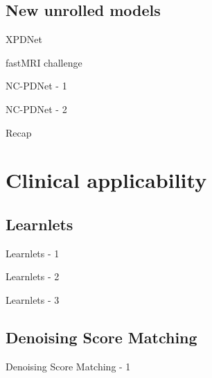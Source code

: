 \documentclass[aspectratio=169,xcolor=dvipsnames]{beamer}
\begin{document}
\subsection{New unrolled models}
\begin{frame}{XPDNet}
\end{frame}

\begin{frame}{fastMRI challenge}
\end{frame}

\begin{frame}{NC-PDNet - 1}
\end{frame}

\begin{frame}{NC-PDNet - 2}
\end{frame}

\begin{frame}{Recap}
\end{frame}

\section{Clinical applicability}
\subsection{Learnlets}
\begin{frame}{Learnlets - 1}
\end{frame}

\begin{frame}{Learnlets - 2}
\end{frame}

\begin{frame}{Learnlets - 3}
\end{frame}

\subsection{Denoising Score Matching}
\begin{frame}{Denoising Score Matching - 1}
\end{frame}
\end{document}

